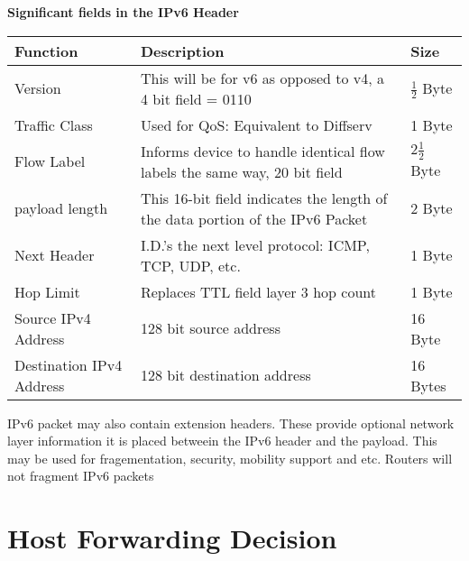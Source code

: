 \documentclass{article}
\begin{document}
\textbf{Significant fields in the IPv6 Header}

\begin{center}
    \begin{tabular}{ |m{5cm}|m{5cm}|m{2cm}| }
        \hline
        
        Function & Description & Size \\
        \hline

        Version & This will be for v6 as opposed to v4, a 4 bit field = 0110 & $\frac{1}{2}$ Byte \\
        \hline

        Traffic Class & Used for QoS: Equivalent to Diffserv & 1 Byte\\
        \hline

        Flow Label & Informs device to handle identical flow labels the same way, 20 bit field & $2\frac{1}{2}$ Byte\\
        \hline

        payload length & This 16-bit field indicates the length of the data portion of the IPv6 Packet & 2 Byte\\
        \hline
        
        Next Header & I.D.'s the next level protocol: ICMP, TCP, UDP, etc. & 1 Byte\\
        \hline

        Hop Limit & Replaces TTL field layer 3 hop count & 1 Byte\\
        \hline
        
        Source IPv4 Address & 128 bit source address & 16 Byte\\
        \hline

        Destination IPv4 Address & 128 bit destination address & 16 Bytes\\
        \hline

    \end{tabular}
\end{center}

\begin{flushleft}
    IPv6 packet may also contain extension headers. These provide optional network layer information
    it is placed betweein the IPv6 header and the payload. This may be used for fragementation, security, mobility
    support and etc. Routers will not fragment IPv6 packets
\end{flushleft}

\section{\textbf{Host Forwarding Decision}}
\end{document}
